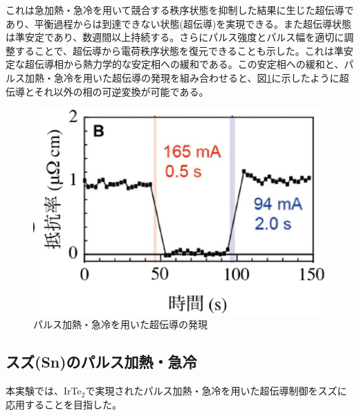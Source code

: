 これは急加熱・急冷を用いて競合する秩序状態を抑制した結果に生じた超伝導であり、平衡過程からは到達できない状態(超伝導)を実現できる。また超伝導状態は準安定であり、数週間以上持続する。さらにパルス強度とパルス幅を適切に調整することで、超伝導から電荷秩序状態を復元できることも示した。これは準安定な超伝導相から熱力学的な安定相への緩和である。この安定相への緩和と、パルス加熱・急冷を用いた超伝導の発現を組み合わせると、図\ref{fig:reversible}に示したように超伝導とそれ以外の相の可逆変換が可能である。
\begin{figure}[!h]
    \begin{center}
   \includegraphics[width=0.5\hsize]{Introduction/reversible.eps}
  \end{center}
  \caption{パルス加熱・急冷を用いた超伝導の発現}
  \label{fig:reversible}
\end{figure}


\subsection{スズ(Sn)のパルス加熱・急冷}
本実験では、IrTe$_2$で実現されたパルス加熱・急冷を用いた超伝導制御をスズに応用することを目指した。



